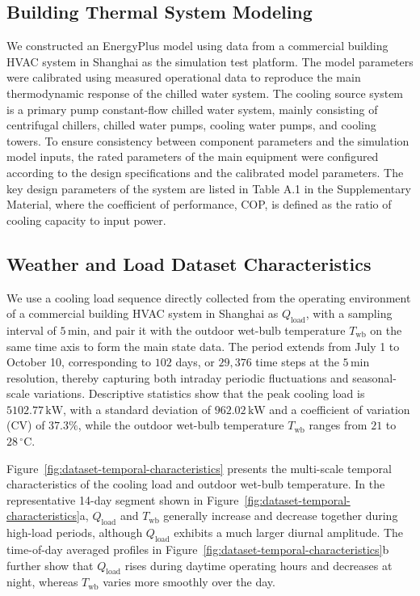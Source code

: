 \documentclass[preprint,12pt]{elsarticle}
\begin{document}
\subsection{Building Thermal System Modeling}\label{building-thermal-system-modeling}

We constructed an EnergyPlus model using data from a commercial building HVAC system in Shanghai as the simulation test platform. The model parameters were calibrated using measured operational data to reproduce the main thermodynamic response of the chilled water system. The cooling source system is a primary pump constant-flow chilled water system, mainly consisting of centrifugal chillers, chilled water pumps, cooling water pumps, and cooling towers. To ensure consistency between component parameters and the simulation model inputs, the rated parameters of the main equipment were configured according to the design specifications and the calibrated model parameters. The key design parameters of the system are listed in Table A.1 in the Supplementary Material, where the coefficient of performance, COP, is defined as the ratio of cooling capacity to input power.

\subsection{Weather and Load Dataset Characteristics}\label{weather-and-load-dataset-characteristics}

We use a cooling load sequence directly collected from the operating environment of a commercial building HVAC system in Shanghai as \(Q_{\mathrm{load}}\), with a sampling interval of \(5\,\mathrm{min}\), and pair it with the outdoor wet-bulb temperature \(T_{\mathrm{wb}}\) on the same time axis to form the main state data. The period extends from July 1 to October 10, corresponding to \(102\) days, or \(29,376\) time steps at the \(5\,\mathrm{min}\) resolution, thereby capturing both intraday periodic fluctuations and seasonal-scale variations. Descriptive statistics show that the peak cooling load is \(5102.77\,\mathrm{kW}\), with a standard deviation of \(962.02\,\mathrm{kW}\) and a coefficient of variation (CV) of \(37.3\%\), while the outdoor wet-bulb temperature \(T_{\mathrm{wb}}\) ranges from \(21\) to \(28\,\mathrm{^{\circ}C}\).

Figure~\ref{fig:dataset-temporal-characteristics} presents the multi-scale temporal characteristics of the cooling load and outdoor wet-bulb temperature. In the representative 14-day segment shown in Figure~\ref{fig:dataset-temporal-characteristics}a, \(Q_{\mathrm{load}}\) and \(T_{\mathrm{wb}}\) generally increase and decrease together during high-load periods, although \(Q_{\mathrm{load}}\) exhibits a much larger diurnal amplitude. The time-of-day averaged profiles in Figure~\ref{fig:dataset-temporal-characteristics}b further show that \(Q_{\mathrm{load}}\) rises during daytime operating hours and decreases at night, whereas \(T_{\mathrm{wb}}\) varies more smoothly over the day.
\end{document}

